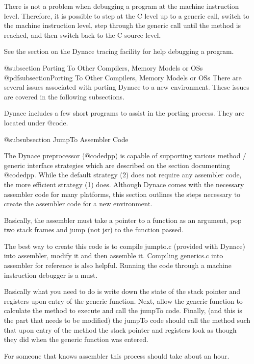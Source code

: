There is not a problem when debugging a program at the machine instruction
level.  Therefore, it is possible to step at the C level up to a generic
call, switch to the machine instruction level, step through the generic
call until the method is reached, and then switch back to the C source
level.


See the section on the Dynace tracing facility for help debugging
a program.



@subsection Porting To Other Compilers, Memory Models or OSs
@pdfsubsection{Porting To Other Compilers, Memory Models or OSs}
There are several issues associated with porting Dynace to a new
environment.  These issues are covered in the following subsections.

Dynace includes a few short programs to assist in the porting process.
They are located under @code{\DYNACE\KERNEL\PORT}.


@subsubsection JumpTo Assembler Code

The Dynace preprocessor (@code{dpp}) is capable of supporting various
method / generic interface strategies which are described on the section
documenting @code{dpp}.  While the default strategy (2) does not require
any assembler code, the more efficient strategy (1) does.  Although
Dynace comes with the necessary assembler code for many platforms, this
section outlines the steps necessary to create the assembler code for a
new environment.

Basically, the assembler must take a pointer to a function as an
argument, pop two stack frames and jump (not jsr) to the function
passed.

The best way to create this code is to compile jumpto.c (provided
with Dynace) into assembler, modify it and then assemble it.  Compiling
generics.c into assembler for reference is also helpful.  Running
the code through a machine instruction debugger is a must.

Basically what you need to do is write down the state of the stack
pointer and registers upon entry of the generic function.  Next, allow
the generic function to calculate the method to execute and call the
jumpTo code.  Finally, (and this is the part that needs to be modified)
the jumpTo code should call the method such that upon entry of the
method the stack pointer and registers look as though they did when
the generic function was entered.

For someone that knows assembler this process should take about an hour.

